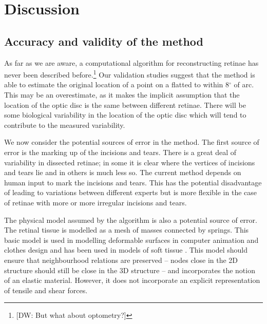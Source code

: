 \documentclass[10pt]{article}
\newcommand{\todo}[1]{{\color{red}[#1]}}
\begin{document}
\section*{Discussion}

\subsection*{Accuracy and validity of the method}

As far as we are aware, a computational algorithm for reconstructing
retinae has never been described
before.\footnote{\todo{DW: But what about optometry?}} Our validation
studies suggest that the method is able to estimate the original
location of a point on a flatted to within 8$^\circ$ of arc. This may
be an overestimate, as it makes the implicit assumption that the
location of the optic disc is the same between different retinae.
There will be some biological variability in the location of the
optic disc which will tend to contribute to the measured variability.

We now consider the potential sources of error in the method. The
first source of error is the marking up of the incisions and
tears. There is a great deal of variability in dissected retinae; in
some it is clear where the vertices of incisions and tears lie and in
others is much less so. The current method depends on human input to
mark the incisions and tears. This has the potential disadvantage of
leading to variations between different experts but is more flexible
in the case of retinae with more or more irregular incisions and
tears. 

The physical model assumed by the algorithm is also a potential source
of error. The retinal tissue is modelled as a mesh of masses connected
by springs. This basic model is used in modelling deformable surfaces
in computer animation and clothes design
\cite{FanEtal98spri,MaCaEtal99flat,WangEtal02surf} and has been used
in models of soft tissue \cite{SkriDunc99real}.  This model should
ensure that neighbourhood relations are preserved -- nodes close in
the 2D structure should still be close in the 3D structure -- and
incorporates the notion of an elastic material. However, it does not
incorporate an explicit representation of tensile and shear forces.
\end{document}
